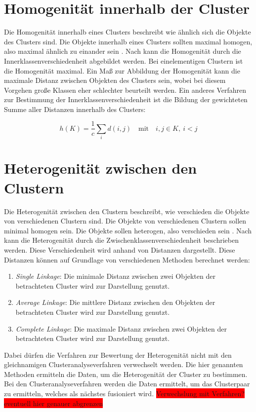 \section{Homogenität innerhalb der Cluster}
Die Homogenität innerhalb eines Clusters beschreibt wie ähnlich sich die Objekte des Clusters sind. Die Objekte innerhalb eines Clusters sollten maximal homogen, also maximal ähnlich zu einander sein \citep[Vgl.][S. 16]{Bacher.2010}.
Nach \citet[S. 181]{Bankhofer.2008} kann die Homogenität durch die Innerklassenverschiedenheit abgebildet werden. Bei einelementigen Clustern ist die Homogenität maximal. Ein Maß zur Abbildung der Homogenität kann die maximale Distanz zwischen Objekten des Clusters sein, wobei bei diesem Vorgehen große Klassen eher schlechter beurteilt werden. Ein anderes Verfahren zur Bestimmung der Innerklassenverschiedenheit ist die Bildung der gewichteten Summe aller Distanzen innerhalb des Clusters:

\begin{equation}
h(K)= \frac{1}{c} \sum_{i} d(i,j) \quad \text{mit} \quad i,j \in K,\: i<j
\end{equation}

\section{Heterogenität zwischen den Clustern}
Die Heterogenität zwischen den Clustern beschreibt, wie verschieden die Objekte von verschiedenen Clustern sind. Die Objekte von verschiedenen Clustern sollen minimal homogen sein. Die Objekte sollen heterogen, also verschieden sein \citep[Vgl.][S. 16]{Bacher.2010}.
Nach \citet[S. 181]{Bankhofer.2008} kann die Heterogenität durch die Zwischenklassenverschiedenheit beschrieben werden. Diese Verschiedenheit wird anhand von Distanzen dargestellt. Diese Distanzen können auf Grundlage von verschiedenen Methoden berechnet werden:
\begin{enumerate}
        \item \textit{Single Linkage}: Die minimale Distanz zwischen zwei Objekten der betrachteten Cluster wird zur Darstellung genutzt.
        \item \textit{Average Linkage}: Die mittlere Distanz zwischen den Objekten der betrachteten Cluster wird zur Darstellung genutzt.
        \item \textit{Complete Linkage}: Die maximale Distanz zwischen zwei Objekten der betrachteten Cluster wird zur Darstellung genutzt.
\end{enumerate}
Dabei dürfen die Verfahren zur Bewertung der Heterogenität nicht mit den gleichnamigen Clusteranalyseverfahren verwechselt werden. Die hier genannten Methoden ermitteln die Daten, um die Heterogenität der Cluster zu bestimmen. Bei den Clusteranalyseverfahren werden die Daten ermittelt, um das Clusterpaar zu ermitteln, welches als nächstes fusioniert wird. 
\colorbox{red}{Verwechslung mit Verfahren? eventuell hier genauer abgrenzen} 

